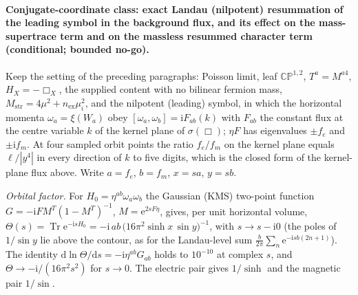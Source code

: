\paragraph{Conjugate-coordinate class: exact Landau (nilpotent) resummation of the leading symbol in the background flux, and its effect on the mass-supertrace term and on the massless resummed character term (conditional; bounded no-go).}
Keep the setting of the preceding paragraphs: Poisson limit, leaf \(\mathbb{CP}^{1,2}\), \(T^a=M^{a4}\), \(H_X=-\Box_X\), the supplied content with no bilinear fermion mass, \(M_{\mathrm{str}}=4\mu^2+n_{\mathrm{ex}}\mu_i^2\), and the nilpotent (leading) symbol, in which the horizontal momenta \(\omega_a=\xi(W_a)\) obey \([\omega_a,\omega_b]=\mathrm iF_{ab}(k)\) with \(F_{ab}\) the constant flux at the centre variable \(k\) of the kernel plane of \(\sigma(\Box)\); \(\eta F\) has eigenvalues \(\pm f_e\) and \(\pm\mathrm if_m\). At four sampled orbit points the ratio \(f_e/f_m\) on the kernel plane equals \(\ell/|y^4|\) in every direction of \(k\) to five digits, which is the closed form of the kernel-plane flux above. Write \(a=f_e\), \(b=f_m\), \(x=sa\), \(y=sb\).

\emph{Orbital factor.} For \(H_0=\eta^{ab}\omega_a\omega_b\) the Gaussian (KMS) two-point function \(G=-\mathrm iFM^{T}(1-M^{T})^{-1}\), \(M=\mathrm e^{2sF\eta}\), gives, per unit horizontal volume, \(\Theta(s)=\operatorname{Tr}\mathrm e^{-\mathrm isH_0}=-\mathrm i\,ab\,\bigl(16\pi^2\sinh x\,\sin y\bigr)^{-1}\), with \(s\to s-\mathrm i0\) (the poles of \(1/\sin y\) lie above the contour, as for the Landau-level sum \(\tfrac{b}{2\pi}\sum_n\mathrm e^{-\mathrm isb(2n+1)}\)). The identity \(\mathrm d\ln\Theta/\mathrm ds=-\mathrm i\eta^{ab}G_{ab}\) holds to \(10^{-10}\) at complex \(s\), and \(\Theta\to-\mathrm i/(16\pi^2s^2)\) for \(s\to0\). The electric pair gives \(1/\sinh\) and the magnetic pair \(1/\sin\).

